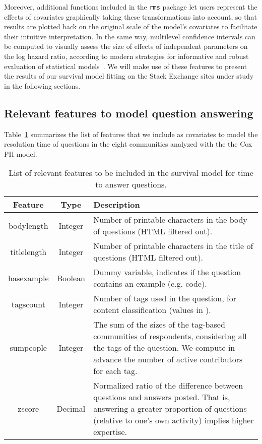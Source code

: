 \documentclass{chi2012}
\newcommand\tabhead[1]{\small\textbf{#1}}
\begin{document}
Moreover, additional functions included in the \texttt{rms} package let users represent 
the effects of covariates graphically taking these transformations into account,
so that results are plotted back on the original scale of the model's covariates to
facilitate their intuitive interpretation. In the same way, multilevel confidence 
intervals can be computed to visually assess the size of effects of independent 
parameters on the log hazard ratio, according to modern strategies for informative 
and robust evaluation of statistical models~\cite{cumming2013}. We will make use 
of these features to present the results of our survival model fitting on the 
Stack Exchange sites under study in the following sections.

\subsection{Relevant features to model question answering}
\label{subsec:model-features}

Table~\ref{tab:features-list} summarizes the list of features that we include as
covariates to model the resolution time of questions in the eight communities analyzed 
with the the Cox PH model.

\begin{table}[h!]
  \centering
  \begin{tabular}{|c|c|l|}
    \hline
    \tabhead{Feature} &
    \multicolumn{1}{|p{0.2\columnwidth}|}{\centering\tabhead{Type}} &
    \multicolumn{1}{|p{0.4\columnwidth}|}{\centering\tabhead{Description}} \\
    \hline
    bodylength & Integer & \multicolumn{1}{|p{0.4\columnwidth}|}{Number of
    printable characters in the body of questions (HTML filtered out).}\\
    \hline
    titlelength & Integer & \multicolumn{1}{|p{0.4\columnwidth}|}{Number of
    printable characters in the title of questions (HTML filtered out).}\\
    \hline
    hasexample & Boolean & \multicolumn{1}{|p{0.4\columnwidth}|}{Dummy variable, 
    indicates if the question contains an example (e.g. code).}\\
    \hline
    tagscount & Integer & \multicolumn{1}{|p{0.4\columnwidth}|}{Number of tags used 
    in the question, for content classification (values in ).}\\
    \hline
    sumpeople & Integer & \multicolumn{1}{|p{0.4\columnwidth}|}{The sum of the
    sizes of the tag-based communities of respondents, considering all the tags of the
    question. We compute in advance the number of active contributors for each tag.}\\
    \hline
    zscore & Decimal & \multicolumn{1}{|p{0.4\columnwidth}|}{Normalized ratio 
    of the difference between questions and answers posted. That is, answering a greater
    proportion of questions (relative to one’s own activity) implies higher expertise.}\\
    \hline
  \end{tabular}
  \caption{List of relevant features to be included in the survival model for
  time to answer questions.}
  \label{tab:features-list}
\end{table}
\end{document}
